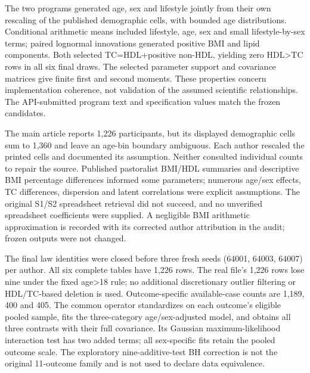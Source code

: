 \documentclass[11pt,letterpaper]{article}
\begin{document}
The two programs generated age, sex and lifestyle jointly from their own rescaling of the published demographic cells, with bounded age distributions. Conditional arithmetic means included lifestyle, age, sex and small lifestyle-by-sex terms; paired lognormal innovations generated positive BMI and lipid components. Both selected TC=HDL+positive non-HDL, yielding zero HDL>TC rows in all six final draws. The selected parameter support and covariance matrices give finite first and second moments. These properties concern implementation coherence, not validation of the assumed scientific relationships. The API-submitted program text and specification values match the frozen candidates.


The main article reports 1,226 participants, but its displayed demographic cells sum to 1,360 and leave an age-bin boundary ambiguous. Each author rescaled the printed cells and documented its assumption. Neither consulted individual counts to repair the source. Published pastoralist BMI/\allowbreak{}HDL summaries and descriptive BMI percentage differences informed some parameters; numerous age/\allowbreak{}sex effects, TC differences, dispersion and latent correlations were explicit assumptions. The original S1/\allowbreak{}S2 spreadsheet retrieval did not succeed, and no unverified spreadsheet coefficients were supplied. A negligible BMI arithmetic approximation is recorded with its corrected author attribution in the audit; frozen outputs were not changed.


The final law identities were closed before three fresh seeds (64001, 64003, 64007) per author. All six complete tables have 1,226 rows. The real file's 1,226 rows lose nine under the fixed age>18 rule; no additional discretionary outlier filtering or HDL/\allowbreak{}TC-based deletion is used. Outcome-specific available-case counts are 1,189, 400 and 405. The common operator standardizes on each outcome's eligible pooled sample, fits the three-category age/\allowbreak{}sex-adjusted model, and obtains all three contrasts with their full covariance. Its Gaussian maximum-likelihood interaction test has two added terms; all sex-specific fits retain the pooled outcome scale. The exploratory nine-additive-test BH correction is not the original 11-outcome family and is not used to declare data equivalence.


\FloatBarrier


\FloatBarrier

\begingroup
\end{document}
